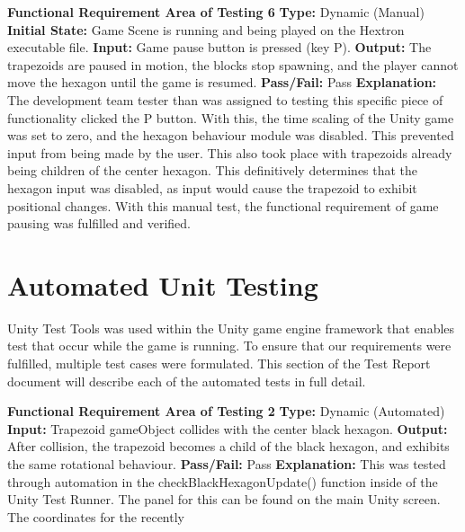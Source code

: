 \documentclass[12pt, titlepage]{article}
\begin{document}
\noindent \textbf{Functional Requirement Area of Testing 6}
\newline
\textbf{Type:} Dynamic (Manual)
\newline
\textbf{Initial State:} Game Scene is running and being played on the Hextron executable file. 
\newline 
\textbf{Input:} Game pause button is pressed (key P).
\newline
\textbf{Output:} The trapezoids are paused in motion, the blocks stop spawning, and the player cannot move the hexagon until the game is resumed.
\newline
\textbf{Pass/Fail:} Pass
\newline
\textbf{Explanation:} The development team tester than was assigned to testing this specific piece of functionality clicked the P button. With this, the time scaling of the Unity game was set to zero, and the hexagon behaviour module was disabled. This prevented input from being made by the user. This also took place with trapezoids already being children of the center hexagon. This definitively determines that the hexagon input was disabled, as input would cause the trapezoid to exhibit positional changes. With this manual test, the functional requirement of game pausing was fulfilled and verified. 




\section{Automated Unit Testing}
    
Unity Test Tools was used within the Unity game engine framework that enables test that occur while the game is running. To ensure that our requirements were fulfilled, multiple test cases were formulated. This section of the Test Report document will describe each of the automated tests in full detail. \newline \newline 
    
    
    \noindent \textbf{Functional Requirement Area of Testing 2}
    \newline
\textbf{Type:} Dynamic (Automated)
\newline
\textbf{Input:} Trapezoid gameObject collides with the center black hexagon. 
\newline
\textbf{Output:} After collision, the trapezoid becomes a child of the
black hexagon, and exhibits the same rotational behaviour.
\newline
\textbf{Pass/Fail:} Pass
\newline
\textbf{Explanation:} This was tested through automation in the checkBlackHexagonUpdate() function inside of the Unity Test Runner. The panel for this can be found on the main Unity screen. The coordinates for the recently \newline \newline 
    
\end{document}
